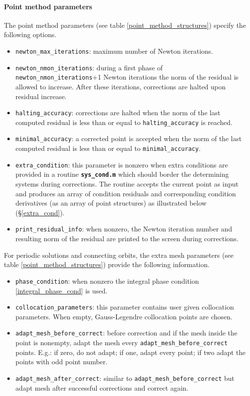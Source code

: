 \documentclass[10pt]{scrartcl}
\newcommand{\file}[1]{\textbf{\texttt{#1}}}
\newcommand{\blist}[1]{\mbox{\lstinline!#1!}}
\begin{document}
{\paragraph{Point method parameters}
The point method parameters (see table \ref{point_method_structures}) 
specify the following options.
\begin{itemize}
\item \blist{newton_max_iterations}: maximum number of Newton
iterations.    
\item \blist{newton_nmon_iterations}: during a first phase of
  \blist{newton_nmon_iterations}+1 Newton iterations the norm of the
  residual is allowed to increase. After these iterations, corrections
  are halted upon residual increase.
\item \blist{halting_accuracy}: corrections are halted when the norm
  of the last computed residual is less than or equal to
  \blist{halting_accuracy} is reached.
\item \blist{minimal_accuracy}: a corrected point is accepted when the
  norm of the last computed residual is less than or equal to
  \blist{minimal_accuracy}.
\item \blist{extra_condition}: this parameter is nonzero when extra
  conditions are provided in a routine \file{sys\_cond.m} which should
  border the determining systems during corrections.  The routine
  accepts the current point as input and produces an array of
  condition residuals and corresponding condition derivatives (as an
  array of point structures) as illustrated below
  (\S\ref{extra_cond}).
\item \blist{print_residual_info}: when nonzero, the Newton iteration
  number and resulting norm of the residual are printed to the screen
  during corrections.
\end{itemize}
For periodic solutions and connecting orbits, the extra mesh
parameters (see table \ref{point_method_structures}) provide the following
information.
\begin{itemize}
\item \blist{phase_condition}: when nonzero the integral phase
  condition \eqref{integral_phase_cond} is used.
\item \blist{collocation_parameters}: this parameter contains user
  given collocation parameters. When empty, Gauss-Legendre collocation
  points are chosen.
\item \blist{adapt_mesh_before_correct}: before correction and if the
  mesh inside the point is nonempty, adapt the mesh every
  \blist{adapt_mesh_before_correct} points.  E.g.: if zero, do not
  adapt; if one, adapt every point; if two adapt the points with odd
  point number.
\item \blist{adapt_mesh_after_correct}: similar to
  \blist{adapt_mesh_before_correct} but adapt mesh after successful
  corrections and correct again.
\end{itemize}

}
\end{document}
